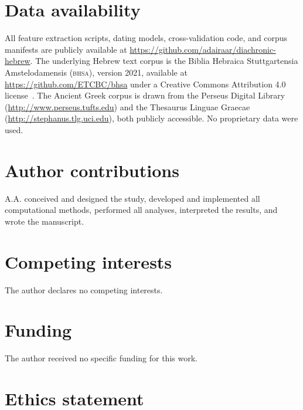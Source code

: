 \documentclass[10pt,letterpaper]{article}
\newcommand{\bhsa}{\textsc{bhsa}}
\begin{document}
\section*{Data availability}

All feature extraction scripts, dating models, cross-validation
code, and corpus manifests are publicly available at
\url{https://github.com/adairaar/diachronic-hebrew}.  The underlying Hebrew text corpus is the Biblia
Hebraica Stuttgartensia Amstelodamensis (\bhsa{}), version 2021,
available at \url{https://github.com/ETCBC/bhsa} under a Creative Commons
Attribution 4.0 license~\cite{BHSA2021}.  The Ancient Greek corpus is
drawn from the Perseus Digital Library (\url{http://www.perseus.tufts.edu})
and the Thesaurus Linguae Graecae (\url{http://stephanus.tlg.uci.edu}),
both publicly accessible.  No proprietary data were used.

\section*{Author contributions}

A.A. conceived and designed the study, developed and implemented all
computational methods, performed all analyses, interpreted the results,
and wrote the manuscript.

\section*{Competing interests}

The author declares no competing interests.

\section*{Funding}

The author received no specific funding for this work.

\section*{Ethics statement}
\end{document}
